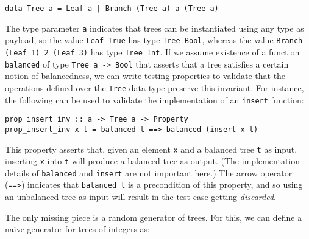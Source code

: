 \documentclass[sigconf,review,anonymous]{acmart}
\newcommand{\quickcheck}{\textit{QuickCheck}\xspace}
\begin{document}
\begin{verbatim}
data Tree a = Leaf a | Branch (Tree a) a (Tree a)
\end{verbatim}

\noindent The type parameter \texttt{a} indicates that trees can be instantiated
using any type as payload, so the value \texttt{Leaf True} has type \texttt{Tree
Bool}, whereas the value \texttt{Branch (Leaf 1) 2 (Leaf 3)} has type
\texttt{Tree Int}.
%
%
%
%
If we assume existence of a function \texttt{balanced} of type \texttt{Tree a ->
Bool} that asserts that a tree satisfies a certain notion of balancedness, we
can write testing properties to validate that the operations defined over the
\texttt{Tree} data type preserve this invariant.
%
For instance, the following can be used to validate the implementation of an
\texttt{insert} function:

\begin{verbatim}
prop_insert_inv :: a -> Tree a -> Property
prop_insert_inv x t = balanced t ==> balanced (insert x t)
\end{verbatim}

\noindent This property asserts that, given an element \texttt{x} and a balanced
tree \texttt{t} as input, inserting \texttt{x} into \texttt{t} will produce a
balanced tree as output.
%
(The implementation details of \texttt{balanced} and \texttt{insert} are not
important here.)
%
The arrow operator (\texttt{==>}) indicates that \texttt{balanced t} is a
precondition of this property, and so using an unbalanced tree as input will
result in the test case getting \emph{discarded}.


The only missing piece is a random generator of trees.
%
For this, we can define a na\"ive generator for trees of integers as:
%
\end{document}
